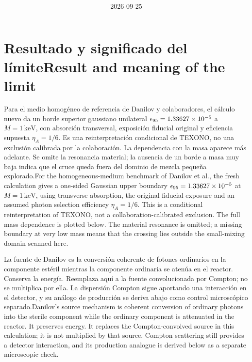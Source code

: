 \documentclass[11pt]{article}
\title{\B{TEXONO sensitivity to transverse hidden photons}{Sensibilidad de TEXONO a fotones ocultos transversales}\\\large\B{A fresh calculation guided by Danilov et al.}{Cálculo nuevo guiado por Danilov y colaboradores}}
\author{\B{Derivation, ROOT/C++ calculation and source audit}{Derivación, cálculo ROOT/C++ y revisión de fuentes}}
\date{2026-09-25}
\newcommand{\B}[2]{\ifspanish#2\else#1\fi}
\begin{document}
\maketitle

\section{\B{Result and meaning of the limit}{Resultado y significado del límite}}
\B{For the homogeneous-medium benchmark of Danilov et al.\cite{danilov}, the fresh calculation gives a one-sided Gaussian upper boundary $\epsilon_{95}=1.33627\times10^{-5}$ at $M=1\,\mathrm{keV}$, using transverse absorption, the original fiducial exposure and an assumed photon selection efficiency $\eta_A=1/6$. This is a conditional reinterpretation of TEXONO, not a collaboration-calibrated exclusion. The full mass dependence is plotted below. The material resonance is omitted; a missing boundary at very low mass means that the crossing lies outside the small-mixing domain scanned here.}
{Para el medio homogéneo de referencia de Danilov y colaboradores\cite{danilov}, el cálculo nuevo da un borde superior gaussiano unilateral $\epsilon_{95}=1.33627\times10^{-5}$ a $M=1\,\mathrm{keV}$, con absorción transversal, exposición fiducial original y eficiencia supuesta $\eta_A=1/6$. Es una reinterpretación condicional de TEXONO, no una exclusión calibrada por la colaboración. La dependencia con la masa aparece más adelante. Se omite la resonancia material; la ausencia de un borde a masa muy baja indica que el cruce queda fuera del dominio de mezcla pequeña explorado.}

\B{Danilov's source mechanism is coherent conversion of ordinary photons into the sterile component while the ordinary component is attenuated in the reactor. It preserves energy. It replaces the Compton-convolved source in this calculation; it is not multiplied by that source. Compton scattering still provides a detector interaction, and its production analogue is derived below as a separate microscopic check.}
{La fuente de Danilov es la conversión coherente de fotones ordinarios en la componente estéril mientras la componente ordinaria se atenúa en el reactor. Conserva la energía. Reemplaza aquí a la fuente convolucionada por Compton; no se multiplica por ella. La dispersión Compton sigue aportando una interacción en el detector, y su análogo de producción se deriva abajo como control microscópico separado.}
\end{document}
